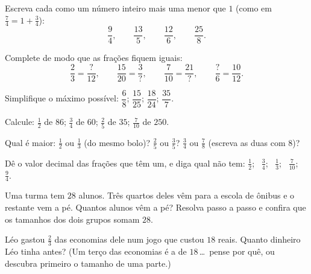 \begin{exercise}[$\star$]\label{exo:g6:fractions:4}
Escreva cada  como um número inteiro mais uma  menor que
$1$ (como em $\frac74 = 1 + \frac34$):
\[
\frac{9}{4}, \qquad \frac{13}{5}, \qquad \frac{12}{6}, \qquad
\frac{25}{8} .
\]
\end{exercise}

\begin{exercise}[$\star$]\label{exo:g6:fractions:5}
Complete de modo que as frações fiquem iguais:
\[
\frac{2}{3} = \frac{?}{12}, \qquad
\frac{15}{20} = \frac{3}{?}, \qquad
\frac{7}{10} = \frac{21}{?}, \qquad
\frac{?}{6} = \frac{10}{12}.
\]
\end{exercise}

\begin{exercise}[$\star$]\label{exo:g6:fractions:6}
Simplifique o máximo possível: $\dfrac{6}{8}$; \quad $\dfrac{15}{25}$;
\quad $\dfrac{18}{24}$; \quad $\dfrac{35}{7}$.
\end{exercise}

\begin{exercise}[$\star$]\label{exo:g6:fractions:7}
Calcule: $\frac12$ de $86$; \quad $\frac34$ de $60$; \quad $\frac25$ de
$35$; \quad $\frac{7}{10}$ de $250$.
\end{exercise}

\begin{exercise}[$\star$]\label{exo:g6:fractions:8}
Qual é maior: $\frac12$ ou $\frac13$ (do mesmo bolo)? $\frac25$ ou
$\frac35$? $\frac34$ ou $\frac78$ (escreva as duas com 
$8$)?
\end{exercise}

\begin{exercise}[$\star\star$]\label{exo:g6:fractions:9}
Dê o valor decimal das frações que têm um, e diga qual  não tem:
$\frac12$; \ $\frac34$; \ $\frac13$; \ $\frac{7}{10}$; \ $\frac{9}{4}$.
\end{exercise}

\begin{exercise}[$\star\star$]\label{exo:g6:fractions:10}
Uma turma tem $28$ alunos. Três quartos deles vêm para a escola de
ônibus e o restante vem a pé. Quantos alunos vêm a pé? Resolva passo a
passo e confira que os tamanhos dos dois grupos somam $28$.
\end{exercise}

\begin{exercise}[$\star\star$]\label{exo:g6:fractions:11}
Léo gastou $\frac23$ das economias dele num jogo que custou $18$ reais.
Quanto dinheiro Léo tinha antes? (Um terço das economias é a  de
$18$\,\dots\ pense por quê, ou descubra primeiro o tamanho de uma
parte.)
\end{exercise}

